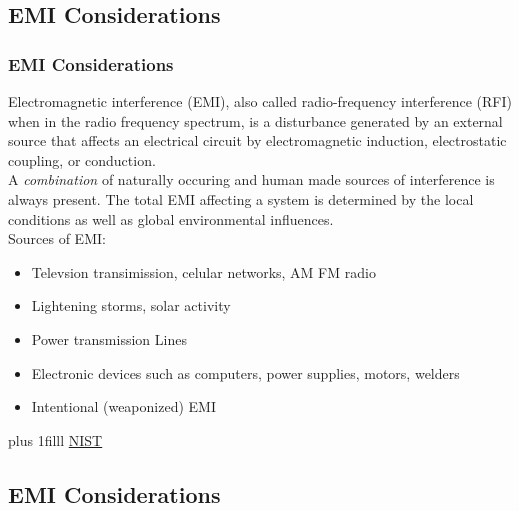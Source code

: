 \documentclass[fleqn]{beamer} %
\newcommand{\sectionIIsubsectionIItitle}{EMI Considerations}
\newcommand{\btVFill}{\vskip0pt plus 1filll}
\begin{document}
		\subsection{\sectionIIsubsectionIItitle}\label{sectionIIsubsectionII}

			\begin{frame}
				\frametitle{\sectionIIsubsectionIItitle} \scriptsize
				\bigskip

				{\RD Electromagnetic interference}  (EMI), also called radio-frequency interference (RFI) when in the radio frequency spectrum, is a disturbance generated by an external source that affects an electrical circuit by electromagnetic induction, electrostatic coupling, or conduction. \vspace{5mm}\\


				A {\it combination} of naturally occuring and human made sources of interference is always present. The total EMI affecting a system is determined by the local conditions as well as global environmental influences. \vspace{5mm}\\


				Sources of EMI:
				\begin{itemize}

					\item Televsion transimission, celular networks, AM FM radio 
					\item Lightening storms, solar activity 
					\item Power transmission Lines	
					\item Electronic devices such as computers, power supplies, motors, welders
				 
					\item Intentional (weaponized) EMI	

				\end{itemize}


				\btVFill
				\tiny{\href{https://csrc.nist.gov/glossary/term/electromagnetic_interference}{NIST}}		
			\end{frame}

		\subsection{\sectionIIsubsectionIItitle}\label{sectionIIsubsectionII}
\end{document}
